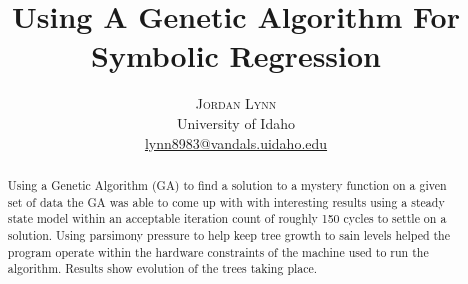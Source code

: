 \documentclass[twoside]{article}
\title{\vspace{-15mm}\fontsize{24pt}{10pt}\selectfont\textbf{Using A Genetic Algorithm For Symbolic Regression}} %
\author{
\large \textsc{Jordan Lynn} \\
\normalsize University of Idaho \\
\normalsize \href{mailto:lynn8983@vandals.uidaho.edu}{lynn8983@vandals.uidaho.edu} %
\vspace{-5mm}
}
\date{}
\begin{document}
\maketitle %

\thispagestyle{fancy} %
\begin{abstract}
Using a Genetic Algorithm (GA) to find a solution to a mystery function on a given set of data the GA was able to come up with with interesting results using a steady state model within an acceptable iteration count of roughly 150 cycles to settle on a solution. Using parsimony pressure to help keep tree growth to sain levels helped the program operate within the hardware constraints of the machine used to run the algorithm. Results show evolution of the trees taking place.
\end{abstract}
\end{document}
